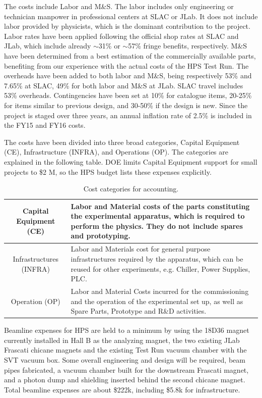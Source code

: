 The costs include Labor and M\&S. The labor includes only engineering or technician manpower in professional centers at SLAC or JLab. It does not 
include labor provided by physicists, which is the dominant contribution to the project. Labor rates have been applied following 
the official shop rates at SLAC and JLab, which include already $\sim$31\% or $\sim$57\% fringe benefits, respectively. M\&S have been determined from a best estimation 
of the commercially available parts,  benefiting from our experience with the actual costs of the HPS Test Run. The overheads have been added to both labor 
and M\&S, being respectively 53\% and 7.65\% at SLAC, 49\% for both labor and M\&S at JLab. SLAC travel includes 53\% overheads. 
Contingencies have been set at 10\% for catalogue items,  20-25\% for items similar to previous design, and 30-50\%  if the design is new.
Since the project is staged 
over three years, an annual inflation rate of 2.5\%  is included in the FY15 and FY16 costs.

The costs have been divided into three broad categories, Capital Equipment (CE), Infrastructure (INFRA), and Operations (OP). 
The categories are explained in the following table. DOE limits Capital Equipment support for small projects to \$2 M, so the HPS budget lists these
expenses explicitly.

\begin{table}[htdp]
\caption{Cost categories for accounting.}
\begin{center}
\begin{tabular}{|c|p{4 in}|}
\hline
Capital Equipment
(CE)
&
Labor and Material costs of the parts constituting the experimental apparatus,
which is required to perform the physics. They do not include spares and
prototyping.
\\
\hline
Infrastructures
(INFRA)
&
Labor and Materials cost for general purpose infrastructures required by the
apparatus, which can be reused for other experiments, e.g. Chiller, Power
Supplies, PLC.
\\
\hline
Operation (OP)
&
Labor and Material Costs incurred for the commissioning and the operation of the
experimental set up, as well as Spare Parts, Prototype and R\&D activities.
\\
\hline
\end{tabular}
\end{center}
\label{tb:costcats}
\end{table}

Beamline expenses for HPS are held to a minimum by using the 18D36 magnet currently installed in Hall B as the analyzing magnet, the 
two existing JLab Frascati chicane magnets and the existing Test Run vacuum chamber with the SVT vacuum box.  Some overall engineering and design will be 
required, beam pipes fabricated, a vacuum chamber built for the downstream 
Frascati magnet, and a photon dump and shielding inserted behind the second chicane magnet. Total beamline expenses are about \$222k, including \$5.8k for infrastructure.

